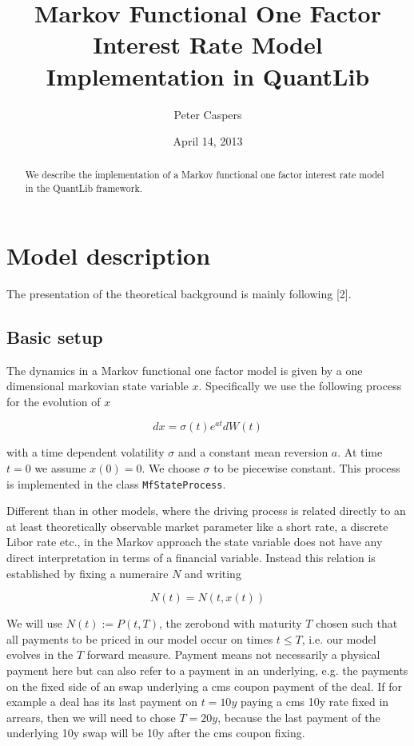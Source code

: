 \documentclass{amsart}
\theoremstyle{plain}
\numberwithin{equation}{section}
\begin{document}
\title[Markov Functional Model Implementation in QuantLib]{Markov Functional One Factor Interest Rate Model Implementation in QuantLib}
\author{Peter Caspers}
\date{April 14, 2013}
\begin{abstract}
We describe the implementation of a Markov functional one factor interest rate model in the QuantLib \cite{ql} framework. 
\end{abstract}
\maketitle

\section{Model description}

The presentation of the theoretical background is mainly following [2].

\subsection{Basic setup}

The dynamics in a Markov functional one factor model is given by a one dimensional markovian state variable $x$. Specifically we
use the following process for the evolution of $x$

\begin{equation}
dx = \sigma(t) e^{at} dW(t)
\end{equation}

with a time dependent volatility $\sigma$ and a constant mean reversion $a$. At time $t=0$ we assume $x(0)=0$. We choose $\sigma$ to
be piecewise constant. This process is implemented in the class  \verb+MfStateProcess+.

Different than in other models, where the driving process is related directly to an at least theoretically observable market parameter like
a short rate, a discrete Libor rate etc., in the Markov approach the state variable does not have any direct interpretation
in terms of a financial variable. Instead this relation is established by fixing a numeraire $N$ and writing

\begin{equation}
N(t) = N(t, x(t))
\end{equation}

We will use $N(t) := P(t,T)$, the zerobond with maturity $T$ chosen such that all payments to be priced in our model occur on times $t \leq T$, i.e.
our model evolves in the $T$ forward measure. Payment means not necessarily a physical payment here but can also refer to a payment in an underlying, e.g.
the payments on the fixed side of an swap underlying a cms coupon payment of the deal. If for example a deal has its last payment on $t=10y$ paying a
cms 10y rate fixed in arrears, then we will need to chose $T=20y$, because the last payment of the underlying 10y swap will be 10y after the cms coupon fixing.
\end{document}
